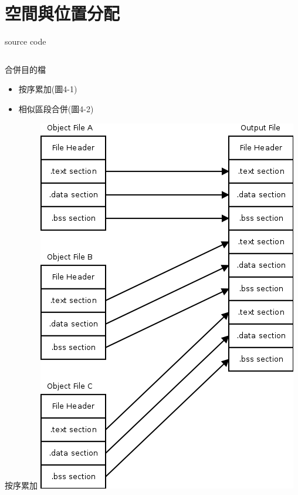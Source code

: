 \section{空間與位置分配}

\begin{frame}{source code}
    \begin{columns}[t]
        \begin{adjustbox}{keepaspectratio}
            
        \end{adjustbox}
        \begin{adjustbox}{keepaspectratio}
            
        \end{adjustbox}
    \end{columns}
\end{frame}

\begin{frame}{合併目的檔}
    \begin{itemize}
        \item 按序累加(圖4-1)
        \item 相似區段合併(圖4-2)
    \end{itemize}
\end{frame}


\begin{frame}{按序累加}
\includegraphics[height=.8\textheight]{./img/4-1.png}
\end{frame}

